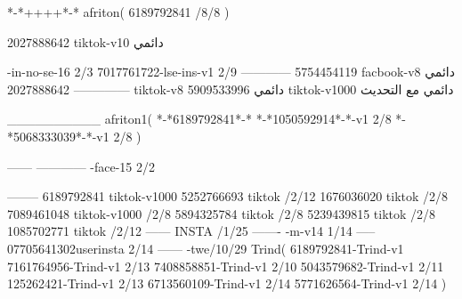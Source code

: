*-*++++*-*
afriton(
6189792841 /8/8
)

2027888642 tiktok-v10
دائمي

-in-no-se-16 2/3
7017761722-lse-ins-v1 2/9
------------
5754454119 facbook-v8
دائمي
--------------
2027888642 tiktok-v8
دائمي
5909533996 tiktok-v1000
دائمي مع التحديث

__________
afriton1(
*-*6189792841*-*
*-*1050592914*-*-v1 2/8
*-*5068333039*-*-v1 2/8
)

------
------------
-face-15 2/2

--------
6189792841 tiktok-v1000
5252766693 tiktok /2/12
1676036020 tiktok /2/8
7089461048 tiktok-v1000 /2/8
5894325784 tiktok /2/8
5239439815 tiktok /2/8
1085702771 tiktok /2/12
------
 INSTA /1/25
-------
-m-v14 1/14
-----
07705641302userinsta 2/14
------
-twe/10/29
Trind(
6189792841-Trind-v1 
7161764956-Trind-v1 2/13
7408858851-Trind-v1 2/10
5043579682-Trind-v1 2/11
125262421-Trind-v1 2/13
6713560109-Trind-v1 2/14
5771626564-Trind-v1 2/14
)
